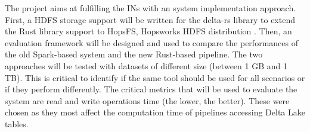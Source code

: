 The project aims at fulfilling the \glspl{IN} with an system implementation approach. First, a \gls{HDFS} storage support will be written for the delta-rs library to extend the Rust library support to HopsFS, Hopsworks \gls{HDFS} distribution \cite{niaziHopsFSScalingHierarchical2017}. Then, an evaluation framework will be designed and used to compare the performances of the old Spark-based system and the new Rust-based pipeline. The two approaches will be tested with datasets of different size (between 1 GB and 1 TB). This is critical to identify if the same tool should be used for all scenarios or if they perform differently. The critical metrics that will be used to evaluate the system are read and write operations time (the lower, the better). These were chosen as they most affect the computation time of pipelines accessing Delta Lake tables.